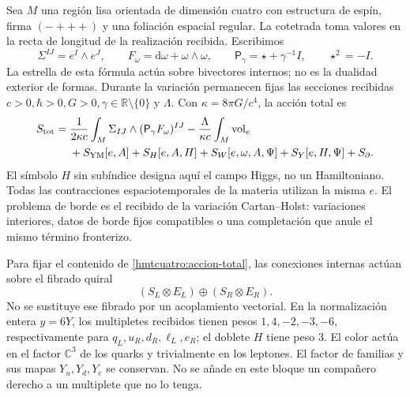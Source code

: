 Sea \(M\) una región lisa orientada de dimensión cuatro con estructura
de espín, firma \((-+++)\) y una foliación espacial regular. La cotetrada
toma valores en la recta de longitud de la realización recibida.
Escribimos
\[
 \Sigma^{IJ}=e^I\wedge e^J,\qquad
 F_\omega=\mathrm d\omega+\omega\wedge\omega,\qquad
 \mathsf P_\gamma=\star+\gamma^{-1}I,\qquad \star^2=-I.
\]
La estrella de esta fórmula actúa sobre bivectores internos; no es la
dualidad exterior de formas. Durante la variación permanecen fijas las
secciones recibidas \(c>0,\hbar>0,G>0,\gamma\in\mathbb R\setminus\{0\}\)
y \(\Lambda\). Con \(\kappa=8\pi G/c^4\), la acción total es
\begin{equation}
 \begin{split}
 S_{\rm tot}={}&\frac1{2\kappa c}
   \int_M\Sigma_{IJ}\wedge(\mathsf P_\gamma F_\omega)^{IJ}
 -\frac{\Lambda}{\kappa c}\int_M\operatorname{vol}_e\\
 &+S_{\rm YM}[e,A]+S_H[e,A,H]
   +S_W[e,\omega,A,\Psi]+S_Y[e,H,\Psi]+S_{\partial}.
 \end{split}
 \label{hmtcuatro:accion-total}
\end{equation}
El símbolo \(H\) sin subíndice designa aquí el campo Higgs, no un
Hamiltoniano. Todas las contracciones espaciotemporales de la materia
utilizan la misma \(e\). El problema de borde es el recibido de la
variación Cartan--Holst: variaciones interiores, datos de borde fijos
compatibles o una completación que anule el mismo término fronterizo.

Para fijar el contenido de \eqref{hmtcuatro:accion-total}, las conexiones
internas actúan sobre el fibrado quiral
\[
 (S_L\otimes E_L)\oplus(S_R\otimes E_R).
\]
No se sustituye ese fibrado por un acoplamiento vectorial. En la
normalización entera \(y=6Y\), los multipletes recibidos tienen pesos
\(1,4,-2,-3,-6\), respectivamente para \(q_L,u_R,d_R,\ell_L,e_R\);
el doblete \(H\) tiene peso \(3\). El color actúa en el factor
\(\mathbb C^3\) de los quarks y trivialmente en los leptones. El factor
de familias y sus mapas \(Y_u,Y_d,Y_e\) se conservan. No se añade en
este bloque un compañero derecho a un multiplete que no lo tenga.

